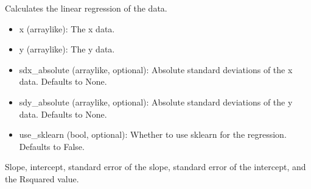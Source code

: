 \documentclass[a4paper,10pt,english]{sphinxmanual}
\begin{document}
\begin{fulllineitems}
\label{\detokenize{utils:src.utils.regression_analysis.calculate_regression}}
\pysigstartsignatures
{}
\pysigstopsignatures
\sphinxAtStartPar
Calculates the linear regression of the data.
\begin{description}
\begin{itemize}
\item {} 
\sphinxAtStartPar
x (array\sphinxhyphen{}like): The x data.

\item {} 
\sphinxAtStartPar
y (array\sphinxhyphen{}like): The y data.

\item {} 
\sphinxAtStartPar
sdx\_absolute (array\sphinxhyphen{}like, optional): Absolute standard deviations of the x data. Defaults to None.

\item {} 
\sphinxAtStartPar
sdy\_absolute (array\sphinxhyphen{}like, optional): Absolute standard deviations of the y data. Defaults to None.

\item {} 
\sphinxAtStartPar
use\_sklearn (bool, optional): Whether to use sklearn for the regression. Defaults to False.

\end{itemize}

\sphinxAtStartPar
Slope, intercept, standard error of the slope, standard error of the intercept, and the R\sphinxhyphen{}squared value.

\end{description}

\end{fulllineitems}

\end{document}

